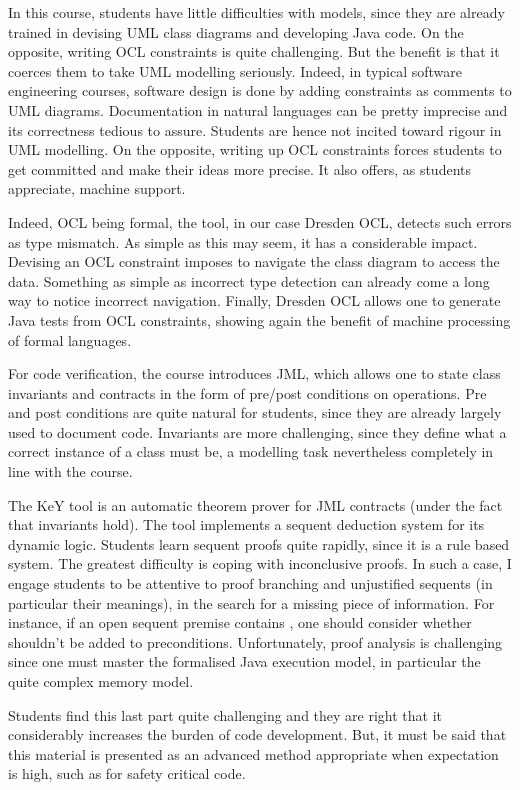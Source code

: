 \documentclass[a4paper,UKenglish]{lipics}
\begin{document}
In this course, students have little difficulties with models, since they are already trained in devising UML class diagrams and developing Java code. On the opposite, writing OCL constraints is quite challenging. But the benefit is that it coerces them to take UML modelling seriously. Indeed, in typical software engineering courses, software design is done by adding constraints as comments to UML diagrams. Documentation in natural languages can be pretty imprecise and its correctness tedious to assure. Students are hence not incited toward rigour in UML modelling. On the opposite, writing up OCL constraints forces students to get committed and make their ideas more precise. It also offers, as students appreciate, machine support.

Indeed, OCL being formal, the tool, in our case Dresden OCL, detects such errors as type mismatch. As simple as this may seem, it has a considerable impact. Devising an OCL constraint imposes to navigate the class diagram to access the data. Something as simple as incorrect type detection can already come a long way to notice incorrect navigation. Finally, Dresden OCL allows one to generate Java tests from OCL constraints, showing again the benefit of machine processing of formal languages.

For code verification, the course introduces JML, which allows one to state class invariants and contracts in the form of pre/post conditions on operations. Pre and post conditions are quite natural for students, since they are already largely used to document code. Invariants are more challenging, since they define what a correct instance of a class must be, a modelling task nevertheless completely in line with the course.

The KeY tool is an automatic theorem prover for JML contracts (under the fact that invariants hold). The tool implements a sequent deduction system for its dynamic logic. Students learn sequent proofs quite rapidly, since it is a rule based system. The greatest difficulty is coping with inconclusive proofs. In such a case, I engage students to be attentive to proof branching and unjustified sequents (in particular their meanings), in the search for a missing piece of information. For instance, if an open sequent premise contains , one should consider whether  shouldn't be added to preconditions. Unfortunately, proof analysis is challenging since one must master the formalised Java execution model, in particular the quite complex memory model.

Students find this last part quite challenging and they are right that it considerably increases the burden of code development. But, it must be said that this material is presented as an advanced method appropriate when expectation is high, such as for safety critical code.
\end{document}
